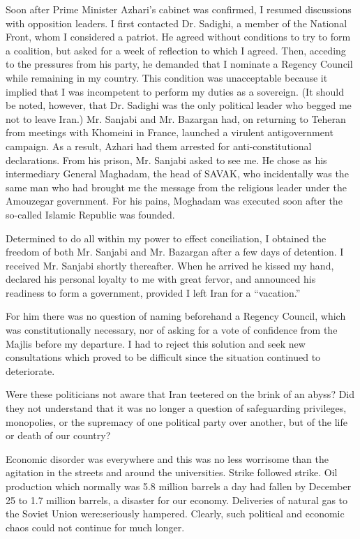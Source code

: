 Soon after Prime Minister Azhari’s cabinet was confirmed, I resumed discussions with opposition leaders. I first contacted Dr. Sadighi, a member of the National Front, whom I considered a patriot. He agreed without conditions to try to form a coalition, but asked for a week of reflection to which I agreed. Then, acceding to the pressures from his party, he demanded that I nominate a Regency Council while remaining in my country. This condition was unacceptable because it implied that I was incompetent to perform my duties as a sovereign. (It should be noted, however, that Dr. Sadighi was the only political leader who begged me not to leave Iran.) Mr. Sanjabi and Mr. Bazargan had, on returning to Teheran from meetings with Khomeini in France, launched a virulent antigovernment campaign. As a result, Azhari had them arrested for anti-constitutional declarations. From his prison, Mr. Sanjabi asked to see me. He chose as his intermediary General Maghadam, the head of SAVAK, who incidentally was the same man who had brought me the message from the religious leader under the Amouzegar government. For his pains, Moghadam was executed soon after the so-called Islamic Republic was founded. 

Determined to do all within my power to effect conciliation, I obtained the freedom of both Mr. Sanjabi and Mr. Bazargan after a few days of detention. I received Mr. Sanjabi shortly thereafter. When he arrived he kissed my hand, declared his personal loyalty to me with great fervor, and announced his readiness to form a government, provided I left Iran for a “vacation.” 

For him there was no question of naming beforehand a Regency Council, which was constitutionally necessary, nor of asking for a vote of confidence from the Majlis before my departure. I had to reject this solution and seek new consultations which proved to be difficult since the situation continued to deteriorate. 

Were these politicians not aware that Iran teetered on the brink of an abyss? Did they not understand that it was no longer a question of safeguarding privileges, monopolies, or the supremacy of one political party over another, but of the life or death of our country? 

Economic disorder was everywhere and this was no less worrisome than the agitation in the streets and around the universities. Strike followed strike. Oil production which normally was 5.8 million barrels a day had fallen by December 25 to 1.7 million barrels, a disaster for our economy. Deliveries of natural gas to the Soviet Union were:seriously hampered. Clearly, such political and economic chaos could not continue for much longer. 

